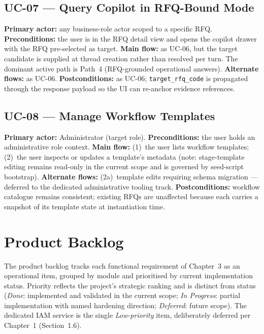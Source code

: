 \subsection{UC-07 --- Query Copilot in RFQ-Bound Mode}
\textbf{Primary actor:} any business-role actor scoped to a specific RFQ. \textbf{Preconditions:} the user is in the RFQ detail view and opens the copilot drawer with the RFQ pre-selected as target. \textbf{Main flow:} as UC-06, but the target candidate is supplied at thread creation rather than resolved per turn. The dominant active path is Path~4 (RFQ-grounded operational answers). \textbf{Alternate flows:} as UC-06. \textbf{Postconditions:} as UC-06; \texttt{target\_rfq\_code} is propagated through the response payload so the UI can re-anchor evidence references.

\subsection{UC-08 --- Manage Workflow Templates}
\textbf{Primary actor:} Administrator (target role). \textbf{Preconditions:} the user holds an administrative role context. \textbf{Main flow:} (1)~the user lists workflow templates; (2)~the user inspects or updates a template's metadata (note: stage-template editing remains read-only in the current scope and is governed by seed-script bootstrap). \textbf{Alternate flows:} (2a)~template edits requiring schema migration --- deferred to the dedicated administrative tooling track. \textbf{Postconditions:} workflow catalogue remains consistent; existing RFQs are unaffected because each carries a snapshot of its template state at instantiation time.

\section{Product Backlog}
\label{app:backlog}

The product backlog tracks each functional requirement of Chapter~3 as an operational item, grouped by module and prioritised by current implementation status. Priority reflects the project's strategic ranking and is distinct from status (\textit{Done}: implemented and validated in the current scope; \textit{In Progress}: partial implementation with named hardening direction; \textit{Deferred}: future scope). The dedicated IAM service is the single \textit{Low-priority} item, deliberately deferred per Chapter~1 (Section~1.6).

